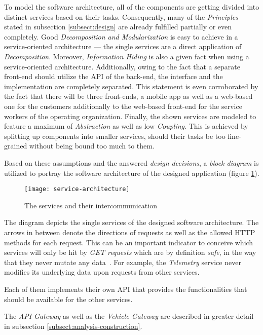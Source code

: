\documentclass[12pt,a4paper,twoside]{report}
\begin{document}
To model the software architecture, all of the components are getting divided
into distinct services based on their tasks. Consequently, many of the
\textit{Principles} stated in subsection \ref{subsect:design} are already fulfilled
partially or even completely. Good \textit{Decomposition and Modularization} is
easy to achieve in a service-oriented architecture --- the single services
are a direct application of \textit{Decomposition}.
Moreover, \textit{Information Hiding} is also a given fact when using a
service-oriented architecture.
Additionally, owing to the fact that a separate front-end should utilize the API
of the back-end, the interface and the implementation are completely separated.
This statement is even corroborated by the fact that there will be three front-ends,
a mobile app as well as a web-based one for the customers additionally to the
web-based front-end for the service workers of the operating organization.
Finally, the shown services are modeled to feature a maximum of \textit{Abstraction}
as well as low \textit{Coupling}. This is achieved by splitting up components
into smaller services, should their tasks be too fine-grained without being
bound too much to them.

Based on these assumptions and the answered \textit{design decisions},
a \textit{block diagram} is utilized to portray the software architecture of the
designed application (figure \ref{fig:service-architecture}).\\

\begin{figure}[htbp]
\centering
\texttt{[image: service-architecture]}
\caption{The services and their intercommunication}
\label{fig:service-architecture}
\end{figure}

The diagram depicts the single services of the designed software architecture.
The arrows in between denote the directions of requests as well
as the allowed HTTP methods for each request.
This can be an important indicator to conceive which services
will only be hit by \textit{GET requests} which are by definition \textit{safe},
in the way that they never mutate any data~\cite{http-rfc}.
For example, the \textit{Telemetry} service never modifies
its underlying data upon requests from other services.

Each of them implements their own API that provides the functionalities that
should be available for the other services.

The \textit{API Gateway} as well as the \textit{Vehicle Gateway} are described
in greater detail in subsection \ref{subsect:analysis-construction}.
\end{document}
